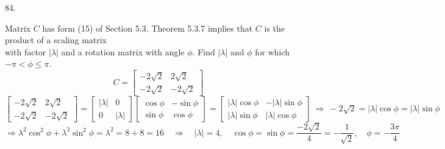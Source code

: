 \documentclass[12pt]{book}
\begin{document}
\begin{CJK}{UTF8}{bsmi}
84. \begin{minipage}[t]{\dimexpr\linewidth}
Matrix $C$ has form (15) of Section 5.3. Theorem 5.3.7 implies that $C$ is the product of a scaling matrix \\
with factor $|\lambda|$ and a rotation matrix with angle $\phi$. Find $|\lambda|$ and $\phi$ for which $-\pi<\phi\leq\pi$.
\[
C=\begin{bmatrix}
-2\sqrt{2} & 2\sqrt{2} \\
-2\sqrt{2} & -2\sqrt{2}
\end{bmatrix}
\]
$\begin{bmatrix}
-2\sqrt{2} & 2\sqrt{2} \\
-2\sqrt{2} & -2\sqrt{2}
\end{bmatrix}=\begin{bmatrix}
|\lambda| & 0 \\
0 & |\lambda|
\end{bmatrix}\begin{bmatrix}
\cos\phi & -\sin\phi \\
\sin\phi & \cos\phi
\end{bmatrix}=\begin{bmatrix}
|\lambda|\cos\phi & -|\lambda|\sin\phi \\
|\lambda|\sin\phi & |\lambda|\cos\phi
\end{bmatrix}\ \Rightarrow\  -2\sqrt{2}=|\lambda|\cos\phi=|\lambda|\sin\phi$
\[
\Rightarrow\lambda^2 \cos^2 \phi+\lambda^2 \sin^2 \phi = \lambda^2 = 8+8 = 16\quad\Rightarrow\quad|\lambda|=4,\quad\cos\phi=\sin\phi=\frac{-2\sqrt{2}}{4}=-\frac{1}{\sqrt{2}},\quad\phi = -\frac{3\pi}{4}
\]
\end{minipage}\\


\end{CJK}
\end{document}
